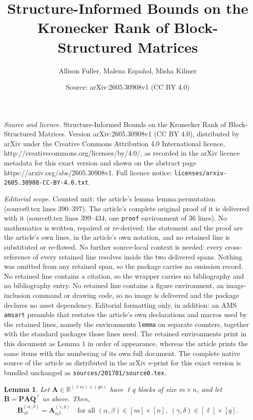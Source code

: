 \documentclass[10pt,a4paper]{amsart}
\title{Structure-Informed Bounds on the Kronecker Rank of Block-Structured Matrices}
\author{Allison Fuller, Malena Espa\~nol, Misha Kilmer}
\date{Source: arXiv:2605.30908v1 (CC BY 4.0)}
\newtheorem{lemma}{Lemma}
\newcommand{\RR}[2]{\mathbb{R}^{#1 \times #2}}
\def\bA{\mathbf{A}}
\def\bB{\mathbf{B}}
\def\bP{\mathbf{P}}
\def\bQ{\mathbf{Q}}
\begin{document}
\maketitle

\noindent\emph{Source and licence.} Structure-Informed Bounds on the Kronecker Rank of Block-Structured Matrices. Version arXiv:2605.30908v1 (CC BY 4.0), distributed by arXiv under the Creative Commons Attribution 4.0 International licence, http://creativecommons.org/licenses/by/4.0/, as recorded in the arXiv licence metadata for this exact version and shown on the abstract page https://arxiv.org/abs/2605.30908v1. Full licence notice: \texttt{licenses/arxiv-2605.30908-CC-BY-4.0.txt}.\par\smallskip

\noindent\textit{Editorial scope.} Counted unit: the article's lemma lemma:permutation (source0.tex lines 390--397). The article's complete original proof of it is delivered with it (source0.tex lines 399--434, one \texttt{proof} environment of 36 lines). No mathematics is written, repaired or re-derived: the statement and the proof are the article's own lines, in the article's own notation, and no retained line is substituted or re-flowed.  No further source-local context is needed: every cross-reference of every retained line resolves inside the two delivered spans.  Nothing was omitted from any retained span, so the package carries no omission record.  No retained line contains a citation, so the wrapper carries no bibliography and no bibliography entry.  No retained line contains a figure environment, an image-inclusion command or drawing code, so no image is delivered and the package declares no asset dependency.  Editorial formatting only, in addition: an AMS \texttt{amsart} preamble that restates the article's own declarations and macros used by the retained lines, namely the environments \texttt{lemma} on separate counters, together with the standard packages those lines need.  The retained environments print in this document as Lemma 1 in order of appearance, whereas the article prints the same items with the numbering of its own full document.  The complete native source of the article as distributed in the arXiv e-print for this exact version is bundled unchanged as \texttt{sources/201701/source0.tex}.
\begin{lemma}\label{lemma:permutation}
Let $\bA\in\RR{(\ell m)}{(qn)}$ have $\ell q$ blocks of size $m\times n$, and let $\bB = \bP\bA\bQ^\top$ as above. Then,
\begin{equation}
\label{eq:element_swap}
    \bB^{(\alpha,\beta)}_{\gamma\delta} = \bA^{(\gamma,\delta)}_{\alpha\beta}
    \quad\text{for all }(\alpha,\beta)\in[m]\times[n],\;(\gamma,\delta)\in[\ell]\times[q].
\end{equation}
\end{lemma}
\end{document}
